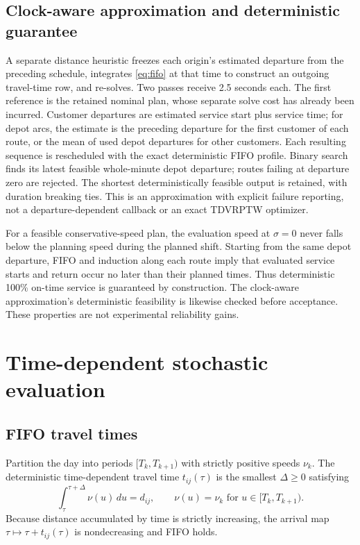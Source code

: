 \documentclass[11pt,a4paper]{article}
\begin{document}
\subsection{Clock-aware approximation and deterministic guarantee}

A separate distance heuristic freezes each origin's estimated departure from
the preceding schedule, integrates \eqref{eq:fifo} at that time to construct an
outgoing travel-time row, and re-solves. Two passes receive 2.5 seconds each.
The first reference is the retained nominal plan, whose separate solve cost
has already been incurred. Customer departures are
estimated service start plus service time; for depot arcs, the estimate is the
preceding departure for the first customer of each route, or the mean of used
depot departures for other customers. Each resulting sequence is rescheduled
with the exact deterministic FIFO profile. Binary search finds its latest
feasible whole-minute depot departure; routes failing at departure zero are
rejected. The shortest deterministically feasible output is retained, with
duration breaking ties. This is an approximation with explicit failure
reporting, not a departure-dependent callback or an exact TDVRPTW optimizer.

For a feasible conservative-speed plan, the evaluation speed at $\sigma=0$
never falls below the planning speed during the planned shift. Starting from
the same depot departure, FIFO and induction along each route imply that
evaluated service starts and return occur no later than their planned times.
Thus deterministic 100\% on-time service is guaranteed by construction.
The clock-aware approximation's deterministic feasibility is likewise checked
before acceptance. These properties are not experimental reliability gains.

\section{Time-dependent stochastic evaluation}

\subsection{FIFO travel times}

Partition the day into periods $[T_k,T_{k+1})$ with strictly positive speeds
$\nu_k$. The deterministic time-dependent travel time $t_{ij}(\tau)$ is the
smallest $\Delta\geq0$ satisfying
\begin{equation}
 \int_{\tau}^{\tau+\Delta}\nu(u)\,du=d_{ij},
 \qquad \nu(u)=\nu_k\text{ for }u\in[T_k,T_{k+1}).           \label{eq:fifo}
\end{equation}
Because distance accumulated by time is strictly increasing, the arrival map
$\tau\mapsto\tau+t_{ij}(\tau)$ is nondecreasing and FIFO holds.
\end{document}
